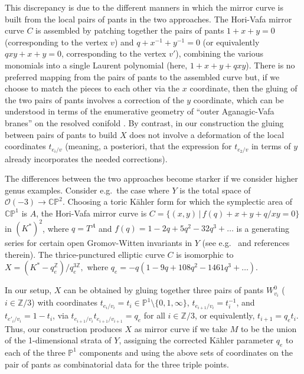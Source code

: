 \documentclass[11pt,leqno]{amsart}
\numberwithin{equation}{section}
\def\CP{\mathbb{CP}}
\def\Z{\mathbb{Z}}
\def\O{{\mathcal O}}
\def\PP{{\mathbb P}}
\begin{document}
This discrepancy is due to the different manners in which
the mirror curve is built from the local pairs of pants in the two approaches.
The Hori-Vafa mirror curve $C$ is assembled by
patching together the pairs of pants $1+x+y=0$ (corresponding to the vertex
$v$) and $q+x^{-1}+y^{-1}=0$ (or equivalently $qxy+x+y=0$, corresponding to the vertex $v'$), combining
the various monomials into a single Laurent polynomial (here, $1+x+y+qxy$).
There is no preferred mapping from the pairs of pants to the assembled
curve but, if we choose to match the pieces to each other via the $x$ 
coordinate, then the gluing of the two pairs of pants involves a correction
of the $y$ coordinate, which can be understood in terms of the enumerative
geometry of ``outer Aganagic-Vafa branes'' on the resolved conifold
\cite{AV}. By contrast, in our construction the gluing between pairs of
pants to build $X$ does not involve a deformation of the 
local coordinates $t_{e_i/v}$ (meaning, a posteriori, that the expression
for $t_{e_2/v}$ in terms of $y$ already incorporates the needed
corrections).

The differences between the two approaches become starker if we consider
higher genus examples. Consider e.g.\ the case where $Y$
is the total space of $\O(-3)\to\CP^2$. Choosing a toric K\"ahler form for which
the symplectic area of $\CP^1$ is $A$, the Hori-Vafa mirror curve is
$C=\{(x,y)\,|\,f(q)+x+y+q/xy=0\}$ in $(K^*)^2$, where
$q=T^A$ and
$f(q)=1-2q+5q^2-32q^3+\dots$ is a generating series for certain open Gromov-Witten
invariants in $Y$ (see e.g.\ \cite[\S 5.3.3]{ChanLauLeung} and references therein). 
The thrice-punctured elliptic curve $C$ is isomorphic to
$X=(K^*- q_e^\Z)/q_e^{3\Z},$ where $q_e=-q(1-9q+108q^2-1461q^3+\dots)$.

In our setup, $X$ can be obtained by gluing together three pairs of pants
$W^0_{v_i}$ ($i\in \Z/3$) with coordinates
$t_{e_i/v_i}=t_i\in \PP^1\setminus \{0,1,\infty\}$, $t_{e_{i+1}/v_i}=t_i^{-1}$, and $t_{e'_i/v_i}=1-t_i$,
via $t_{e_{i+1}/v_i}t_{e_{i+1}/v_{i+1}}=q_e$ for all $i\in \Z/3$,
or equivalently, $t_{i+1}=q_et_i$. Thus, our construction produces $X$ as
mirror curve if we take $M$ to be the union of the 1-dimensional strata of
$Y$, assigning the corrected K\"ahler parameter $q_e$ to each of the three
$\PP^1$ components and using the above sets of coordinates on the pair of
pants as combinatorial data for the three triple points.
\end{document}
